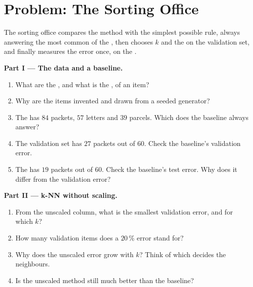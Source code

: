 \section{Problem: The Sorting Office}\label{sec:g11:k-nearest-neighbours:problem}

\begin{problem}\label{pb:g11:k-nearest-neighbours:1}
The sorting office compares the method with the simplest possible rule, always answering the most common  of the
, then chooses $k$ and the  on the validation set, and finally measures the error once, on the .

\label{lst:g11:k-nearest-neighbours:office}

\label{out:g11:k-nearest-neighbours:office}

\medskip\noindent\textbf{Part I --- The data and a baseline.}
\begin{enumerate}
  \item What are the , and what is the , of an item?
  \item Why are the items invented and drawn from a seeded generator?
  \item The  has $84$ packets, $57$ letters and $39$ parcels. Which  does the baseline always answer?
  \item The validation set has $27$ packets out of $60$. Check the baseline's validation error.
  \item The  has $19$ packets out of $60$. Check the baseline's test error. Why does it differ from the
    validation error?
\end{enumerate}

\medskip\noindent\textbf{Part II --- k-NN without scaling.}
\begin{enumerate}[resume]
  \item From the unscaled column, what is the smallest validation error, and for which $k$?
  \item How many validation items does a $20\,\%$ error stand for?
  \item Why does the unscaled error grow with $k$? Think of which  decides the neighbours.
  \item Is the unscaled method still much better than the baseline?
\end{enumerate}


\end{problem}
